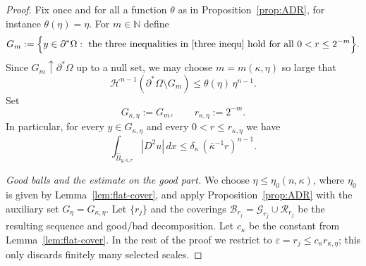 \documentclass[reqno,11pt]{amsart}
\numberwithin{equation}{section}
\theoremstyle{remark}
\begin{document}
\begin{proof}
{Fix once and for all a function $\theta$ as in Proposition~\ref{prop:ADR}, for instance $\theta(\eta)=\eta$.}
For $m\in\mathbb N$ define
\[
G_m:=\Bigl\{y\in\partial^*\Omega:\ \text{the three inequalities in \eqref{three inequ} hold for all }0<r\le 2^{-m}\Bigr\}.
\]
Since $G_m\uparrow \partial^*\Omega$ up to a null set, we may choose $m=m(\kappa,\eta)$ so large that
\[
\mathscr H^{n-1}(\partial^*\Omega\setminus G_m)\le \theta(\eta)\,\eta^{n-1}.
\]
Set
\[
G_{\kappa,\eta}:=G_m,\qquad r_{\kappa,\eta}:=2^{-m}.
\]
In particular, for every $y\in G_{\kappa,\eta}$ and every $0<r\le r_{\kappa,\eta}$ we have
\begin{equation}\label{7.1}
{
\int_{\widehat B_{y,\bar\kappa,r}}|D^2u|\,dx \le \delta_\kappa\,(\bar\kappa^{-1}r)^{n-1}.
}
\end{equation}

\smallskip
\noindent\emph{Good balls and the estimate on the good part.}
{We choose $\eta\le \eta_0(n,\kappa)$, where $\eta_0$ is given by Lemma~\ref{lem:flat-cover}, and apply
Proposition~\ref{prop:ADR} with the auxiliary set $G_\eta=G_{\kappa,\eta}$. Let $\{r_j\}$ and the coverings
$\mathcal B_{r_j}=\mathcal G_{r_j}\cup\mathcal R_{r_j}$ be the resulting sequence and good/bad decomposition.
Let $c_\kappa$ be the constant from Lemma~\ref{lem:flat-cover}. In the rest of the proof we restrict to
$\varepsilon=r_j\le c_\kappa r_{\kappa,\eta}$; this only discards finitely many selected scales.}


\end{proof}
\end{document}
